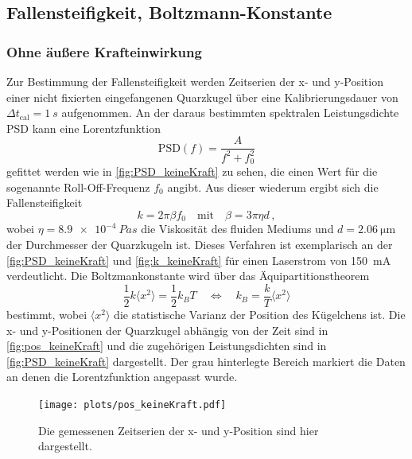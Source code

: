 \subsection{Fallensteifigkeit, Boltzmann-Konstante}
\subsubsection*{Ohne äußere Krafteinwirkung}
    Zur Bestimmung der Fallensteifigkeit werden Zeitserien der x- und y-Position einer nicht fixierten eingefangenen Quarzkugel über eine Kalibrierungsdauer von $\Delta t_{\mathrm{cal}} = \qty{1}{s}$ aufgenommen.
    An der daraus bestimmten spektralen Leistungsdichte PSD kann eine Lorentzfunktion
    \begin{equation*}
        \mathrm{PSD}(f) = \frac{A}{f^2 + f_0^2}
    \end{equation*}
    gefittet werden wie in \autoref{fig:PSD_keineKraft} zu sehen, die einen Wert für die sogenannte Roll-Off-Frequenz $f_0$ angibt.
    Aus dieser wiederum ergibt sich die Fallensteifigkeit
    \begin{equation*}
        k = 2 \pi \beta f_0 \quad \mathrm{mit} \quad \beta = 3 \pi \eta d \,,
    \end{equation*}
    wobei $\eta = \qty{8,9e-4}{Pa s}$ die Viskosität des fluiden Mediums und $d=\qty{2,06}{\um}$ der Durchmesser der Quarzkugeln ist.
    Dieses Verfahren ist exemplarisch an der \autoref{fig:PSD_keineKraft} und \ref{fig:k_keineKraft} für einen Laserstrom von \qty{150}{mA} verdeutlicht.
    Die Boltzmankonstante wird über das Äquipartitionstheorem
    \begin{equation*}
        \frac{1}{2} k \langle x^2 \rangle = \frac{1}{2} k_B T \quad \Leftrightarrow \quad k_B = \frac{k}{T} \langle x^2 \rangle
    \end{equation*}
    bestimmt, wobei $\langle x^2 \rangle$ die statistische Varianz der Position des Kügelchens ist.
    Die x- und y-Positionen der Quarzkugel abhängig von der Zeit sind in \autoref{fig:pos_keineKraft} und die zugehörigen Leistungsdichten sind in \autoref{fig:PSD_keineKraft} dargestellt.
    Der grau hinterlegte Bereich markiert die Daten an denen die Lorentzfunktion angepasst wurde.
    \begin{figure}[ht]
        \centering\captionsetup{format=plain}
        \texttt{[image: plots/pos\_keineKraft.pdf]} \vspace*{-0.5cm}
        \caption{Die gemessenen Zeitserien der x- und y-Position sind hier dargestellt.}
        \label{fig:pos_keineKraft}
    \end{figure}
